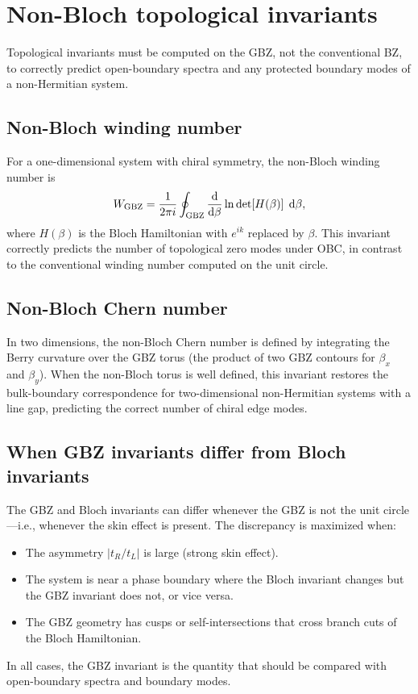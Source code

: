 \section{Non-Bloch topological invariants}
\label{sec:non-bloch-invariants}

Topological invariants must be computed on the GBZ, not the conventional
BZ, to correctly predict open-boundary spectra and any protected
boundary modes of a non-Hermitian system.

\subsection{Non-Bloch winding number}
\label{ssec:non-bloch-winding}

For a one-dimensional system with chiral symmetry, the non-Bloch winding
number is
\begin{equation}
 W_{\mathrm{GBZ}} = \frac{1}{2\pi i}
 \oint_{\mathrm{GBZ}}
 \frac{\mathop{}\!\mathrm{d}}{\mathop{}\!\mathrm{d}\beta}\ln\det[H(\beta)]\;\mathop{}\!\mathrm{d}\beta,
 \label{eq:non-bloch-winding}
\end{equation}
where $H(\beta)$ is the Bloch Hamiltonian with $e^{ik}$ replaced by
$\beta$. This invariant correctly predicts the number of topological
zero modes under OBC, in contrast to the conventional winding number
computed on the unit circle.

\subsection{Non-Bloch Chern number}
\label{ssec:non-bloch-chern}

In two dimensions, the non-Bloch Chern number is defined by integrating
the Berry curvature over the GBZ torus (the product of two GBZ contours
for $\beta_x$ and $\beta_y$). When the non-Bloch torus is well defined,
this invariant restores the bulk-boundary correspondence for
two-dimensional non-Hermitian systems with a line gap, predicting the
correct number of chiral edge modes.

\subsection{When GBZ invariants differ from Bloch invariants}
\label{ssec:gbz-vs-bloch}

The GBZ and Bloch invariants can differ whenever the GBZ is not the unit
circle---i.e., whenever the skin effect is present. The discrepancy
is maximized when:
\begin{itemize}
 \item The asymmetry $|t_R/t_L|$ is large (strong skin effect).
 \item The system is near a phase boundary where the Bloch invariant
 changes but the GBZ invariant does not, or vice versa.
 \item The GBZ geometry has cusps or self-intersections that cross
 branch cuts of the Bloch Hamiltonian.
\end{itemize}
In all cases, the GBZ invariant is the quantity that should be compared
with open-boundary spectra and boundary modes.

